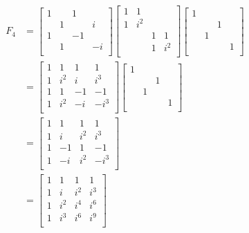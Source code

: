 \documentclass[a4paper]{article}
\begin{document}
\begin{align*}
	F_{4} & = \begin{bmatrix}
		1 &  & 1 & \\
		 & 1 &  & i \\
		1 &  & -1 & \\
		 & 1 &  & -i \\
	\end{bmatrix} 
	\begin{bmatrix}
		1 & 1 &  & \\
		1 & i^{2} &  & \\
		 &  & 1 & 1\\
		 &  & 1 & i^{2} \\
	\end{bmatrix}
	\begin{bmatrix}
		1 &  &  & \\
		 &  & 1 & \\
		 & 1 &  & \\
		 &  &  & 1 \\
	\end{bmatrix} \\
	      & = \begin{bmatrix}
	      	1 & 1 & 1 & 1 \\
	      	1 & i^{2} & i & i^{3} \\
	      	1 & 1 & -1 & -1 \\
	      	1 & i^{2} & -i & -i^{3} \\
	      \end{bmatrix}
	      \begin{bmatrix}
	      	1 &  &  & \\
	      	 &  & 1 & \\
	      	 & 1 &  & \\
	      	 &  &  & 1 \\
	      \end{bmatrix} \\
	      & = \begin{bmatrix}
	      	1 & 1 & 1 & 1 \\
	      	1 & i & i^{2} & i^{3} \\
	      	1 & -1 & 1 & -1 \\
	      	1 & -i & i^{2} & -i^{3} \\
	      \end{bmatrix} \\
	      & = \begin{bmatrix}
	      	1 & 1 & 1 & 1 \\
	      	1 & i & i^{2} & i^{3} \\
	      	1 & i^{2} & i^{4} & i^{6} \\
	      	1 & i^{3} & i^{6} & i^{9}\\
	      \end{bmatrix}
\end{align*}
\end{document}
